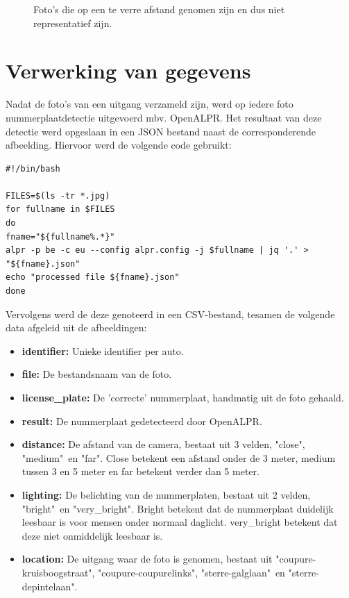 \begin{figure}[h!]
\begin{subfigure}[b]{0.45\linewidth}
	\end{subfigure}
	\caption{Foto's die op een te verre afstand genomen zijn en dus niet representatief zijn.}
	\label{fig:onlyfar}
\end{figure}

\section{Verwerking van gegevens}

Nadat de foto's van een uitgang verzameld zijn, werd op iedere foto nummerplaatdetectie uitgevoerd mbv. OpenALPR. Het resultaat van deze detectie werd opgeslaan in een JSON bestand naast de corresponderende afbeelding. Hiervoor werd de volgende code gebruikt:

\begin{verbatim}
#!/bin/bash

FILES=$(ls -tr *.jpg)
for fullname in $FILES
do
fname="${fullname%.*}"
alpr -p be -c eu --config alpr.config -j $fullname | jq '.' > "${fname}.json"
echo "processed file ${fname}.json" 
done
\end{verbatim}

Vervolgens werd de deze genoteerd in een CSV-bestand, tesamen de volgende data afgeleid uit de afbeeldingen:
\begin{itemize}
	\item \textbf{identifier:} Unieke identifier per auto.
	\item \textbf{file:} De bestandsnaam van de foto.
	\item \textbf{license\_plate:} De 'correcte' nummerplaat, handmatig uit de foto gehaald.
	\item \textbf{result:} De nummerplaat gedetecteerd door OpenALPR.
	\item \textbf{distance:} De afstand van de camera, bestaat uit 3 velden, "close", "medium"\ en "far". Close betekent een afstand onder de 3 meter, medium tussen 3 en 5 meter en far betekent verder dan 5 meter.
	\item \textbf{lighting:} De belichting van de nummerplaten, bestaat uit 2 velden, "bright"\ en "very\_bright". Bright betekent dat de nummerplaat duidelijk leesbaar is voor mensen onder normaal daglicht. very\_bright betekent dat deze niet onmiddelijk leesbaar is.
	\item \textbf{location:} De uitgang waar de foto is genomen, bestaat uit "coupure-kruisboogstraat", "coupure-coupurelinks", "sterre-galglaan"\ en "sterre-depintelaan".
\end{itemize}

